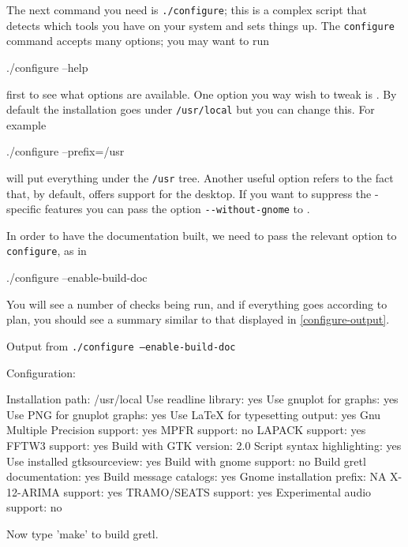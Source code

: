 The next command you need is \texttt{./configure}; this is a complex
script that detects which tools you have on your system and sets
things up. The \texttt{configure} command accepts many
options; you may want to run 
\begin{code}
./configure --help
\end{code}
first to see what options are available. One option you way wish to
tweak is .  By default the installation goes under
\verb+/usr/local+ but you can change this.  For example
\begin{code}
./configure --prefix=/usr
\end{code}
will put everything under the \verb+/usr+ tree.  Another useful option
refers to the fact that, by default,  offers support for
the  desktop.  If you want to suppress the
-specific features you can pass the option
\verb+--without-gnome+ to .

In order to have the documentation built, we need to pass the relevant
option to \texttt{configure}, as in
\begin{code}
./configure --enable-build-doc
\end{code}
You will see a number of checks being run, and if everything goes
according to plan, you should see a summary similar to that displayed
in \ref{configure-output}.

\begin{script}[htbp]
  \caption{Output from \texttt{./configure --enable-build-doc}}
  \label{configure-output}
\begin{scode}
Configuration:

  Installation path:                      /usr/local
  Use readline library:                   yes
  Use gnuplot for graphs:                 yes
  Use PNG for gnuplot graphs:             yes
  Use LaTeX for typesetting output:       yes
  Gnu Multiple Precision support:         yes
  MPFR support:                           no
  LAPACK support:                         yes
  FFTW3 support:                          yes
  Build with GTK version:                 2.0
  Script syntax highlighting:             yes
  Use installed gtksourceview:            yes
  Build with gnome support:               no
  Build gretl documentation:              yes
  Build message catalogs:                 yes
  Gnome installation prefix:              NA
  X-12-ARIMA support:                     yes
  TRAMO/SEATS support:                    yes
  Experimental audio support:             no

Now type 'make' to build gretl.
\end{scode}
\end{script}

